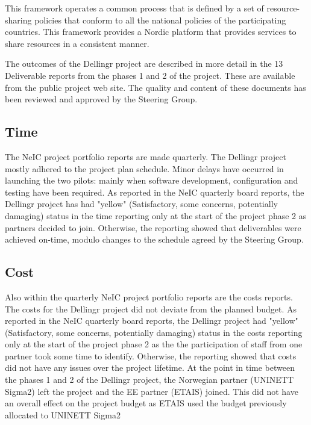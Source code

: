 \documentclass{article}
\newcommand{\dell}{Dellingr\xspace}
\begin{document}
This framework operates a common process that is defined by a set of resource-sharing policies
that conform to all the national policies of the participating countries.
This framework provides a Nordic platform that provides services to share resources
in a consistent manner.

The outcomes of the \dell project are described in more detail in the 13 Deliverable reports
from the phases 1 and 2 of the project.
These are available from the public project web site.
The quality and content of these documents has been reviewed and approved by the Steering Group.
\subsection{Time}

The NeIC project portfolio reports are made quarterly.
The \dell project mostly adhered to the project plan schedule.
Minor delays have occurred in launching the two pilots:
mainly when software development, configuration and testing  have been required.
As reported in the NeIC quarterly board reports, the \dell project has had "yellow" (Satisfactory, some concerns, potentially damaging)
status in the time reporting only at the start of the project phase 2 as partners decided to join.
Otherwise, the reporting showed that deliverables were achieved on-time, modulo changes to the schedule agreed by the Steering Group.

\subsection{Cost}

Also within the quarterly NeIC project portfolio reports are the costs reports.
The costs for the \dell project did not deviate from the planned budget.
As reported in the NeIC quarterly board reports, the \dell project had "yellow" (Satisfactory, some concerns, potentially damaging)
status in the costs reporting only at the start of the project phase 2 as the the participation of staff from one partner
took some time to identify.
Otherwise, the reporting showed that costs did not have any issues over the project lifetime.
At the point in time between the phases 1 and 2 of the \dell project,
the Norwegian partner (UNINETT Sigma2) left the project and the EE partner (ETAIS) joined.
This did not have an overall effect on the project budget as ETAIS used the budget previously allocated to UNINETT Sigma2
\end{document}
